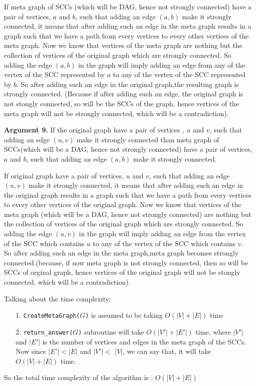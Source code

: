 \documentclass[answers]{exam}
\begin{document}
\begin{questions}
\begin{solution}
If meta graph of SCCs (which will be DAG, hence not strongly connected) have a pair of vertices, $a$ and $b$, such that adding an edge $(a,b)$ make it strongly connected, it means that after adding such an edge in the meta graph results in a graph such that we have a path from every vertices to every other vertices of the meta graph. Now we know that vertices of the meta graph are nothing but the collection of vertices of the original graph which are strongly connected. So adding the edge $(a,b)$ in the graph will imply adding an edge from any of the vertex of the SCC represented by $a$  to any of the vertex of the SCC represented by $b$. So after adding such an edge in the original graph,the resulting graph is strongly connected. (Because if after adding such an edge, the original graph is not stongly connected, so will be the SCCs of the graph, hence vertices of the meta graph will not be strongly connected, which will be a contradiction).


\textbf{Argument 9.} If the original graph have a pair of vertices , $u$ and $v$, such that adding an edge $(u,v)$ make it strongly connected than meta graph of SCCs(which will be a DAG, hence not strongly connected) have a pair of vertices, $a$ and $b$, such that adding an edge $(a,b)$ make it strongly connected.

If original graph have a pair of vertices, $u$ and $v$, such that adding an edge $(u,v)$ make it strongly connected, it means that after adding such an edge in the original graph results in a graph such that we have a path from every vertices to every other vertices of the original graph. Now we know that vertices of the meta graph (which will be a DAG, hence not strongly connected) are nothing but the collection of vertices of the original graph which are strongly connected. So adding the edge $(u,v)$ in the graph will imply adding an edge from the vertex of the SCC which contains $u$  to any of the vertex of the SCC which contains $v$. So after adding such an edge in the meta graph,meta graph becomes strongly connected.(because, if now meta graph is not strongly connected, then so will be SCCs of orginal graph, hence vertices of the original graph will not be stongly connected, which will be a contradiction).

Talking about the time complexity:
\begin{enumerate}
    \item [1.] {\tt CreateMetaGraph($G$)} is assumed to be taking $O(|V|+|E|)$ time 
    \item [2.] {\tt return\_answer($G$)} subroutine will take $O(|V'|+|E'|)$ time, where $|V'|$ and $|E'|$ is the number of vertices and edges in the meta graph of the SCCs. Now since $|E'|<|E|$ and $|V'|<$ $|V|$, we can say that, it will take $O(|V|+|E|)$ time.
\end{enumerate}

So the total time complexity of the algorithm is : $O(|V|+|E|)$

\end{solution}








\end{questions}
\end{document}
